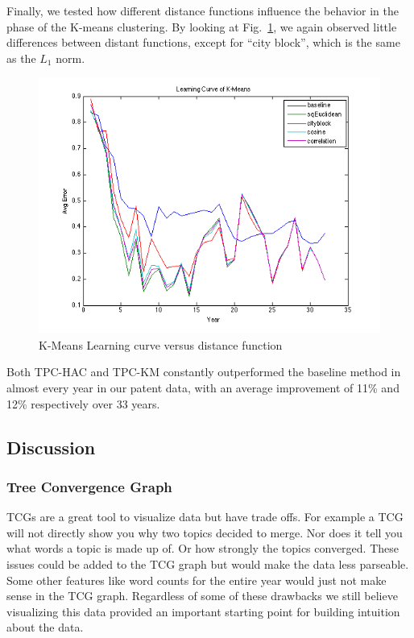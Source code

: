 \documentclass[conference]{IEEEtran}
\begin{document}
Finally, we tested how different distance functions influence the behavior in the phase of the K-means clustering. By looking at Fig.~\ref{kmeans_dist}, we again observed little differences between distant functions, except for ``city block'', which is the same as the $L_1$ norm.
\begin{figure}[h]
	\center
	\includegraphics[width=.50\textwidth]{fig/kmeans_dist.png}
	\caption{K-Means Learning curve versus distance function}
	\label{kmeans_dist}
\end{figure}


Both TPC-HAC and TPC-KM constantly outperformed the baseline method in almost every year in our patent data, with an average improvement of 11\% and 12\% respectively over 33 years.

\subsection{Discussion}

\subsubsection{Tree Convergence Graph}
TCGs are a great tool to visualize data but have trade offs. For example a TCG will not directly show you why two topics decided to merge. Nor does it tell you what words a topic is made up of. Or how strongly the topics converged. These issues could be added to the TCG graph but would make the data less parseable. Some other features like word counts for the entire year would just not make sense in the TCG graph. Regardless of some of these drawbacks we still believe visualizing this data provided an important starting point for building intuition about the data.
\end{document}
